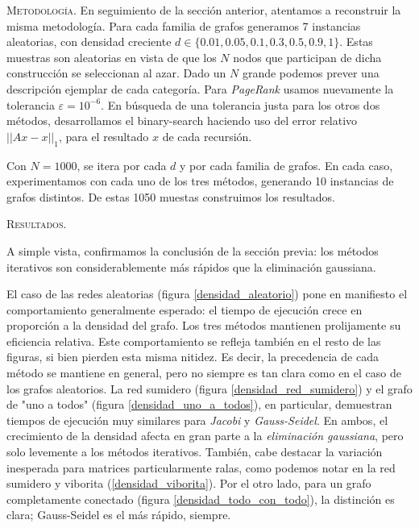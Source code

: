 \noindent\textsc{Metodología}.
En seguimiento de la sección anterior, atentamos a reconstruir la misma metodología.
Para cada familia de grafos generamos 7 instancias aleatorias, con densidad creciente $d \in \{0.01, 0.05, 0.1, 0.3, 0.5, 0.9, 1\}$.
Estas muestras son aleatorias en vista de que los $N$ nodos que participan de dicha construcción se seleccionan al azar.
Dado un $N$ grande podemos prever una descripción ejemplar de cada categoría. %
Para \textit{PageRank} usamos nuevamente la tolerancia $\varepsilon = 10^{-6}$.
En búsqueda de una tolerancia justa para los otros dos métodos, desarrollamos el binary-search haciendo uso del error relativo $||Ax - x||_1$,
para el resultado $x$ de cada recursión. 

Con $N = 1000$, se itera por cada $d$ y por cada familia de grafos. En cada caso, experimentamos con cada uno de los tres métodos, generando 10 instancias de grafos distintos.
De estas 1050 muestas construimos los resultados. 

\vspace{2em}
\noindent\textsc{Resultados}.

A simple vista, confirmamos la conclusión de la sección previa: los métodos iterativos son considerablemente más rápidos que la eliminación gaussiana.

El caso de las redes aleatorias (figura \ref{densidad_aleatorio}) pone en manifiesto el comportamiento generalmente esperado: 
el tiempo de ejecución crece en proporción a la densidad del grafo.
Los tres métodos mantienen prolijamente su eficiencia relativa.
Este comportamiento se refleja también en el resto de las figuras, si bien pierden esta misma nitidez.
Es decir, la precedencia de cada método se mantiene en general, pero no siempre es tan clara como en el caso de los grafos aleatorios.
La red sumidero (figura \ref{densidad_red_sumidero}) y el grafo de "uno a todos" (figura \ref{densidad_uno_a_todos}), en particular,
demuestran tiempos de ejecución muy similares para \emph{Jacobi} y \emph{Gauss-Seidel}.
En ambos, el crecimiento de la densidad afecta en gran parte a la \emph{eliminación gaussiana}, pero solo levemente a los métodos iterativos.
También, cabe destacar la variación inesperada para matrices particularmente ralas, como podemos notar en la red sumidero y viborita (\ref{densidad_viborita}).
Por el otro lado, para un grafo completamente conectado (figura \ref{densidad_todo_con_todo}), la distinción es clara; Gauss-Seidel es el más rápido, siempre.

